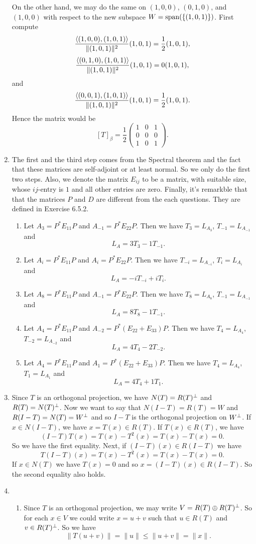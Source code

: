 \begin{enumerate}
On the other hand, we may do the same on $(1,0,0)$, $(0,1,0)$, and $(1,0,0)$ with respect to the new subspace $W=\sp(\{(1,0,1)\})$. First compute 
\[\frac{\lag (1,0,0),(1,0,1)\rag }{\|(1,0,1)\|^2}(1,0,1)=\frac{1}{2}(1,0,1),\]
\[\frac{\lag (0,1,0),(1,0,1)\rag }{\|(1,0,1)\|^2}(1,0,1)=0(1,0,1),\]
and 
\[\frac{\lag (0,0,1),(1,0,1)\rag }{\|(1,0,1)\|^2}(1,0,1)=\frac{1}{2}(1,0,1).\]
Hence the matrix would be 
\[[T]_{\beta}=\frac{1}{2}\begin{pmatrix}1&0&1\\0&0&0\\1&0&1\end{pmatrix}.\]
\item The first and the third step comes from the Spectral theorem and the fact that these matrices are self-adjoint or at least normal. So we only do the first two steps. Also, we denote the matrix $E_{ij}$ to be a matrix, with suitable size, whose $ij$-entry is $1$ and all other entries are zero. Finally, it's remarkble that that the matrices $P$ and $D$ are different from the each questions. They are defined in Exercise 6.5.2. \begin{enumerate}
\item Let $A_3=P^*E_{11}P$ and $A_{-1}=P^*E_{22}P$. Then we have $T_3=L_{A_3}$, $T_{-1}=L_{A_{-1}}$ and 
\[L_A=3T_3-1T_{-1}.\]
\item Let $A_{i}=P^*E_{11}P$ and $A_{i}=P^*E_{22}P$. Then we have $T_{-i}=L_{A_{-i}}$, $T_{i}=L_{A_{i}}$ and 
\[L_A=-iT_{-i}+iT_{i}.\]
\item Let $A_{8}=P^*E_{11}P$ and $A_{-1}=P^*E_{22}P$. Then we have $T_{8}=L_{A_{8}}$, $T_{-1}=L_{A_{-1}}$ and 
\[L_A=8T_{8}-1T_{-1}.\]
\item Let $A_{4}=P^*E_{11}P$ and $A_{-2}=P^*(E_{22}+E_{33})P$. Then we have $T_{4}=L_{A_{4}}$, $T_{-2}=L_{A_{-2}}$ and 
\[L_A=4T_{4}-2T_{-2}.\]
\item Let $A_{4}=P^*E_{11}P$ and $A_{1}=P^*(E_{22}+E_{33})P$. Then we have $T_{4}=L_{A_{4}}$, $T_{1}=L_{A_{1}}$ and 
\[L_A=4T_{4}+1T_{1}.\]
\end{enumerate}
\item Since $T$ is an orthogonal projection, we have $N(T)=R(T)\pp$ and $R(T)=N(T)\pp$. Now we want to say that $N(I-T)=R(T)=W$ and $R(I-T)=N(T)=W\pp$ and so $I-T$ is the orthogonal projection on $W\pp$. If $x\in N(I-T)$, we have $x=T(x)\in R(T)$. If $T(x)\in R(T)$, we have 
\[(I-T)T(x)=T(x)-T^2(x)=T(x)-T(x)=0.\]
So we have the first equality. Next, if $(I-T)(x)\in R(I-T)$ we have 
\[T(I-T)(x)=T(x)-T^2(x)=T(x)-T(x)=0.\]
If $x\in N(T)$ we have $T(x)=0$ and so $x=(I-T)(x)\in R(I-T)$. So the second equality also holds.
\item \begin{enumerate}
\item Since $T$ is an orthogonal projection, we may write $V=R(T)\oplus R(T)\pp$. So for each $x\in V$ we could write $x=u+v$ such that $u\in R(T)$ and $v\in R(T)\pp$. So we have 
\[\|T(u+v)\|=\|u\|\leq \|u+v\|=\|x\|.\]


\end{enumerate}
\end{enumerate}
